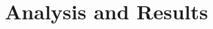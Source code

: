 \documentclass [11pt, proquest] {uwthesis}[2015/03/03]
\begin{document}
%
%
%
%
%

 
\chapter{Analysis and Results}
\end{document}

